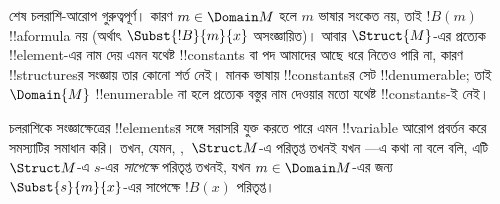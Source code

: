 \documentclass[../../../include/open-logic-section]{subfiles}
\begin{document}
\begin{explain}
শেষ
 চলরাশি-আরোপ
গুরুত্বপূর্ণ।  কারণ $m \in \Domain M$ হলে $m$ ভাষার সংকেত নয়,
তাই $!B(m)$ !!a{formula} নয় (অর্থাৎ $\Subst{!B}{m}{x}$ অসংজ্ঞায়িত)।
আবার $\Struct{M}$-এর প্রত্যেক !!{element}-এর নাম দেয় এমন যথেষ্ট
!!{constant}s বা পদ আমাদের আছে ধরে নিতেও পারি না, কারণ
!!{structure}sর সংজ্ঞায় তার কোনো শর্ত নেই। মানক ভাষায়
!!{constant}sর সেট !!{denumerable}; তাই $\Domain{M}$
!!{enumerable} না হলে প্রত্যেক বস্তুর নাম দেওয়ার মতো যথেষ্ট
!!{constant}s-ই নেই।

চলরাশিকে সংজ্ঞাক্ষেত্রের !!{element}sর সঙ্গে সরাসরি যুক্ত করতে পারে
এমন !!{variable} আরোপ প্রবর্তন করে সমস্যাটির সমাধান করি। তখন, যেমন,
,~$\Struct M$-এ
পরিতৃপ্ত তখনই যখন —এ কথা না বলে বলি, এটি~$\Struct M$-এ $s$-এর
\emph{সাপেক্ষে} পরিতৃপ্ত তখনই, যখন 
$m \in \Domain M$-এর জন্য~$\Subst{s}{m}{x}$-এর সাপেক্ষে $!B(x)$
পরিতৃপ্ত।
\end{explain}
\end{document}
